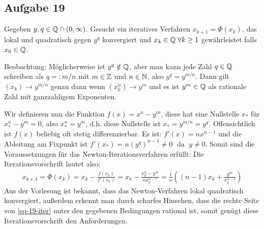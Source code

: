 \subsection*{Aufgabe 19}

Gegeben $y, q \in \mathbb Q \cap (0, \infty)$. Gesucht ein iteratives Verfahren $x_{k + 1} = \Phi (x_k)$,
das lokal und quadratisch gegen $y^q$ konvergiert und $x_k \in \mathbb Q \; \forall k \ge 1$
gewährleistet falls $x_0 \in \mathbb Q$.

Beobachtung: Möglicherweise ist $y^q \notin \mathbb Q$, aber man kann jede Zahl
$q \in \mathbb Q$ schreiben als $q =: m /n$ mit $m \in \mathbb Z$ und $n \in \mathbb N$,
also $y^q = y^{m/n}$. Dann gilt $(x_k) \rightarrow y^{m/n}$ genau dann wenn
$\left(x_k^n\right)\rightarrow y^m$ und es ist $y^m \in \mathbb Q$ als rationale Zahl
mit ganzzahligem Exponenten.

Wir definieren nun die Funktion $f(x) = x^n - y^m$, diese hat eine Nullstelle $x_*$
für $x_*^n - y^m = 0$, also  $x_*^n = y^m$, d.h. diese Nullstelle ist
$x_* = y^{m/n}= y^q$. Offensichtlich ist $f(x)$ beliebig oft
stetig differenzierbar. Es ist: $f'(x) = n x^{n - 1}$ und die Ableitung
am Fixpunkt ist $f'(x_*) =  n (y^q)^{n-1} \ne 0 \; \text{ da } \; y \ne 0$.
Somit sind die Voraussetzungen für das Newton-Iterationsverfahren erfüllt:
Die Iterationsvorschrift lautet also:
\begin{align}
  \label{eq-19-iter}
  x_{k+1} =  \Phi (x_k)
  = x_k - \frac{f(x_k)}{f'(x_k)} = x_k - \frac{x_k^n - y^m}{n x_k^{n-1}}
  = \frac{1}{n} \left((n -1)x_k + \frac{y^m}{x_k^{n-1}} \right)
\end{align}
Aus der Vorlesung ist bekannt, dass das Newton-Verfahren lokal quadratisch
konvergiert, außerdem erkennt man durch scharfes Hinsehen, dass die rechte Seite
von \eqref{eq-19-iter} unter den gegebenen Bedingungen rational ist, somit
genügt diese Iterationsvorschrift den Anforderungen.
